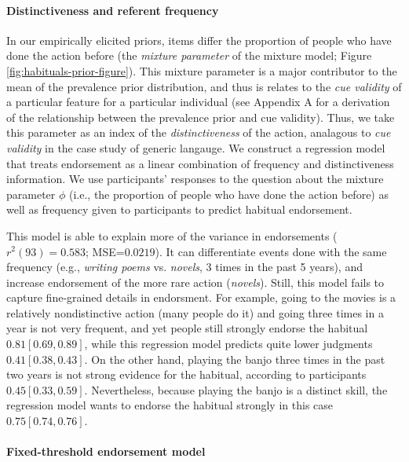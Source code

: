 \documentclass[english,floatsintext,man]{apa6}
\theoremstyle{definition}
\theoremstyle{definition}
\theoremstyle{definition}
\theoremstyle{remark}
\begin{document}
\paragraph{Distinctiveness and referent
frequency}\label{distinctiveness-and-referent-frequency}

In our empirically elicited priors, items differ the proportion of
people who have done the action before (the \emph{mixture parameter} of
the mixture model; Figure \ref{fig:habituals-prior-figure}). This
mixture parameter is a major contributor to the mean of the prevalence
prior distribution, and thus is relates to the \emph{cue validity} of a
particular feature for a particular individual (see Appendix A for a
derivation of the relationship between the prevalence prior and cue
validity). Thus, we take this parameter as an index of the
\emph{distinctiveness} of the action, analagous to \emph{cue validity}
in the case study of generic langauge. We construct a regression model
that treats endorsement as a linear combination of frequency and
distinctiveness information. We use participants' responses to the
question about the mixture parameter \(\phi\) (i.e., the proportion of
people who have done the action before) as well as frequency given to
participants to predict habitual endorsement.

This model is able to explain more of the variance in endorsements
(\(r^2(93) = 0.583\); MSE=\(0.0219\)). It can differentiate events done
with the same frequency (e.g., \emph{writing poems} vs. \emph{novels}, 3
times in the past 5 years), and increase endorsement of the more rare
action (\emph{novels}). Still, this model fails to capture fine-grained
details in endorsment. For example, going to the movies is a relatively
nondistinctive action (many people do it) and going three times in a
year is not very frequent, and yet people still strongly endorse the
habitual \(0.81 [0.69, 0.89]\), while this regression model predicts
quite lower judgments \(0.41 [0.38, 0.43]\). On the other hand, playing
the banjo three times in the past two years is not strong evidence for
the habitual, according to participants \(0.45 [0.33, 0.59]\).
Nevertheless, because playing the banjo is a distinct skill, the
regression model wants to endorse the habitual strongly in this case
\(0.75 [0.74, 0.76]\).

\paragraph{Fixed-threshold endorsement
model}\label{fixed-threshold-endorsement-model}
\end{document}
